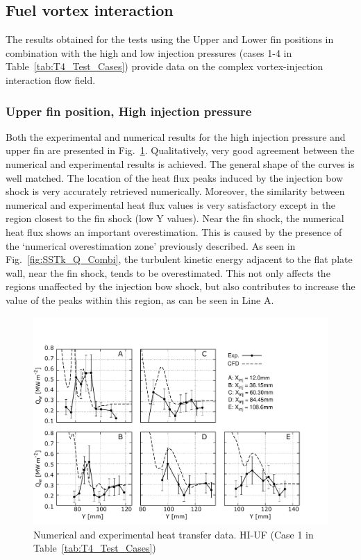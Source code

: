 \documentclass{AIAA}
\begin{document}
\subsection{Fuel vortex interaction}

The results obtained for the tests using the Upper and Lower fin positions in combination with the high and low injection pressures (cases 1-4 in Table~\ref{tab:T4_Test_Cases}) provide data on the complex vortex-injection interaction flow field.


\subsubsection{Upper fin position, High injection pressure}

Both the experimental and numerical results for the high injection pressure and upper fin are presented in Fig.~\ref{fig:HeatFluxLPHIUF}. Qualitatively, very good agreement between the numerical and experimental results is achieved. The general shape of the curves is well matched. The location of the heat flux peaks induced by the injection bow shock is very accurately retrieved numerically. Moreover, the similarity between numerical and experimental heat flux values is very satisfactory except in the region closest to the fin shock (low Y values). Near the fin shock, the numerical heat flux shows an important overestimation. This is caused by the presence of the `numerical overestimation zone' previously described. As seen in Fig.~\ref{fig:SSTk_Q_Combi}, the turbulent kinetic energy adjacent to the flat plate wall, near the fin shock, tends to be overestimated. This not only affects the regions unaffected by the injection bow shock, but also contributes to increase the value of the peaks within this region, as can be seen in Line A. 

%
\begin{figure}[!h]
\center
\includegraphics[trim = 0mm 3mm 25mm 25mm, clip, width=0.60\columnwidth,valign=t,fbox]{Figures/Data/LP_HI_UF/GNUP_CFD_GaugesLines_Multi.pdf}
\caption{Numerical and experimental heat transfer data. HI-UF (Case 1 in Table~\ref{tab:T4_Test_Cases})}
\label{fig:HeatFluxLPHIUF}
\end{figure} 
\end{document}
